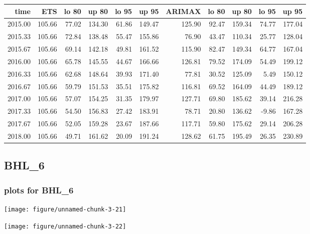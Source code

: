 \documentclass[10pt,a4paper]{article}\usepackage[]{graphicx}\usepackage[]{color}
\makeatletter
\def\maxwidth{ %
  \ifdim\Gin@nat@width>\linewidth
    \linewidth
  \else
    \Gin@nat@width
  \fi
}
\newcommand{\AaA}{\_}
\makeatother
\begin{document}
\begin{table}[ht]
\centering
\begin{tabular}{rrrrrrrrrrr}
  \hline
time & ETS  & lo 80 & up 80 & lo 95 & up 95 & ARIMAX  & lo 80 & up 80 & lo 95 & up 95 \\ 
  \hline
2015.00 & 105.66 & 77.02 & 134.30 & 61.86 & 149.47 & 125.90 & 92.47 & 159.34 & 74.77 & 177.04 \\ 
  2015.33 & 105.66 & 72.84 & 138.48 & 55.47 & 155.86 & 76.90 & 43.47 & 110.34 & 25.77 & 128.04 \\ 
  2015.67 & 105.66 & 69.14 & 142.18 & 49.81 & 161.52 & 115.90 & 82.47 & 149.34 & 64.77 & 167.04 \\ 
  2016.00 & 105.66 & 65.78 & 145.55 & 44.67 & 166.66 & 126.81 & 79.52 & 174.09 & 54.49 & 199.12 \\ 
  2016.33 & 105.66 & 62.68 & 148.64 & 39.93 & 171.40 & 77.81 & 30.52 & 125.09 & 5.49 & 150.12 \\ 
  2016.67 & 105.66 & 59.79 & 151.53 & 35.51 & 175.82 & 116.81 & 69.52 & 164.09 & 44.49 & 189.12 \\ 
  2017.00 & 105.66 & 57.07 & 154.25 & 31.35 & 179.97 & 127.71 & 69.80 & 185.62 & 39.14 & 216.28 \\ 
  2017.33 & 105.66 & 54.50 & 156.83 & 27.42 & 183.91 & 78.71 & 20.80 & 136.62 & -9.86 & 167.28 \\ 
  2017.67 & 105.66 & 52.05 & 159.28 & 23.67 & 187.66 & 117.71 & 59.80 & 175.62 & 29.14 & 206.28 \\ 
  2018.00 & 105.66 & 49.71 & 161.62 & 20.09 & 191.24 & 128.62 & 61.75 & 195.49 & 26.35 & 230.89 \\ 
   \hline
\end{tabular}
\end{table}

\newpage
\subsection{BHL\AaA 6}
\subsubsection{plots for BHL\AaA 6}

\texttt{[image: figure/unnamed-chunk-3-21]} 

\newpage

\texttt{[image: figure/unnamed-chunk-3-22]} 
\end{document}
